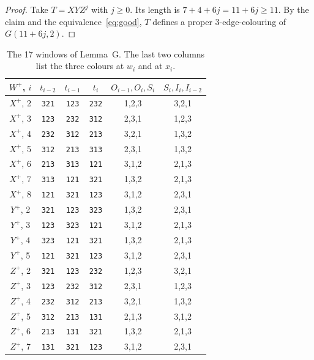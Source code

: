 \documentclass[11pt]{amsart}
\theoremstyle{plain}
\theoremstyle{definition}
\theoremstyle{remark}
\numberwithin{equation}{section}
\newcommand{\sym}[1]{\texttt{#1}}
\begin{document}
\begin{proof}
Take \(T=XYZ^j\) with \(j\ge0\). Its length is \(7+4+6j=11+6j\ge 11\). By the claim and the equivalence~\eqref{eq:good}, \(T\) defines a proper \(3\)-edge-colouring of \(G(11+6j,2)\).
\end{proof}

\begin{table}[ht]
\caption{The 17 windows of Lemma~G. The last two columns list the three colours at \(w_i\) and at \(x_i\).}\label{tab:windows}
\begin{tabular}{cccccc}
\toprule
\(W^+\), \(i\) & \(t_{i-2}\) & \(t_{i-1}\) & \(t_i\) & \(O_{i-1},O_i,S_i\) & \(S_i,I_i,I_{i-2}\) \\
\midrule
\(X^+\), 2 & \sym{321} & \sym{123} & \sym{232} & 1,2,3 & 3,2,1 \\
\(X^+\), 3 & \sym{123} & \sym{232} & \sym{312} & 2,3,1 & 1,2,3 \\
\(X^+\), 4 & \sym{232} & \sym{312} & \sym{213} & 3,2,1 & 1,3,2 \\
\(X^+\), 5 & \sym{312} & \sym{213} & \sym{313} & 2,3,1 & 1,3,2 \\
\(X^+\), 6 & \sym{213} & \sym{313} & \sym{121} & 3,1,2 & 2,1,3 \\
\(X^+\), 7 & \sym{313} & \sym{121} & \sym{321} & 1,3,2 & 2,1,3 \\
\(X^+\), 8 & \sym{121} & \sym{321} & \sym{123} & 3,1,2 & 2,3,1 \\
\midrule
\(Y^+\), 2 & \sym{321} & \sym{123} & \sym{323} & 1,3,2 & 2,3,1 \\
\(Y^+\), 3 & \sym{123} & \sym{323} & \sym{121} & 3,1,2 & 2,1,3 \\
\(Y^+\), 4 & \sym{323} & \sym{121} & \sym{321} & 1,3,2 & 2,1,3 \\
\(Y^+\), 5 & \sym{121} & \sym{321} & \sym{123} & 3,1,2 & 2,3,1 \\
\midrule
\(Z^+\), 2 & \sym{321} & \sym{123} & \sym{232} & 1,2,3 & 3,2,1 \\
\(Z^+\), 3 & \sym{123} & \sym{232} & \sym{312} & 2,3,1 & 1,2,3 \\
\(Z^+\), 4 & \sym{232} & \sym{312} & \sym{213} & 3,2,1 & 1,3,2 \\
\(Z^+\), 5 & \sym{312} & \sym{213} & \sym{131} & 2,1,3 & 3,1,2 \\
\(Z^+\), 6 & \sym{213} & \sym{131} & \sym{321} & 1,3,2 & 2,1,3 \\
\(Z^+\), 7 & \sym{131} & \sym{321} & \sym{123} & 3,1,2 & 2,3,1 \\
\bottomrule
\end{tabular}
\end{table}
\end{document}
